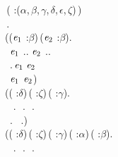 \begin{holmath}
    \,( :(\ensuremath{\alpha},\,\ensuremath{\beta},\,\ensuremath{\gamma},\,\ensuremath{\delta},\,\ensuremath{\epsilon},\,\ensuremath{\zeta})\,)\,\HOLSymConst{\HOLTokenEquiv{}}\\
\,.\,\HOLSymConst{\HOLTokenConj{}}\\
(\HOLSymConst{\HOLTokenForall{}}(\ensuremath{\HOLBoundVar{e}\sb{\mathrm{1}}} :\ensuremath{\beta})\,(\ensuremath{\HOLBoundVar{e}\sb{\mathrm{2}}} :\ensuremath{\beta}).\\
\,\,\,\ensuremath{\HOLBoundVar{e}\sb{\mathrm{1}}}\,\HOLSymConst{\HOLTokenIn{}}\,..\,\HOLSymConst{\HOLTokenConj{}}\,\ensuremath{\HOLBoundVar{e}\sb{\mathrm{2}}}\,\HOLSymConst{\HOLTokenIn{}}\,..\,\HOLSymConst{\HOLTokenImp{}}\\
\,\,\,.\,\ensuremath{\HOLBoundVar{e}\sb{\mathrm{1}}}\,\ensuremath{\HOLBoundVar{e}\sb{\mathrm{2}}}\,\HOLSymConst{\HOLTokenImp{}}\\
\,\,\,\ensuremath{\HOLBoundVar{e}\sb{\mathrm{1}}}\,\HOLSymConst{\HOLTokenNotEqual{}}\,\ensuremath{\HOLBoundVar{e}\sb{\mathrm{2}}})\,\HOLSymConst{\HOLTokenConj{}}\\
(\HOLSymConst{\HOLTokenForall{}}( :\ensuremath{\delta})\,( :\ensuremath{\zeta})\,( :\ensuremath{\gamma}).\\
\,\,\,\,\HOLSymConst{\HOLTokenIn{}}\,.\,\HOLSymConst{\HOLTokenConj{}}\,\,\HOLSymConst{\HOLTokenIn{}}\,.\,\HOLSymConst{\HOLTokenConj{}}\,\,\HOLSymConst{\HOLTokenIn{}}\,.\,\HOLSymConst{\HOLTokenImp{}}\\
\,\,\,.\,\,\,\,\HOLSymConst{\HOLTokenIn{}}\,.)\,\HOLSymConst{\HOLTokenConj{}}\\
(\HOLSymConst{\HOLTokenForall{}}( :\ensuremath{\delta})\,( :\ensuremath{\zeta})\,( :\ensuremath{\gamma})\,( :\ensuremath{\alpha})\,( :\ensuremath{\beta}).\\
\,\,\,\,\HOLSymConst{\HOLTokenIn{}}\,.\,\HOLSymConst{\HOLTokenConj{}}\,\,\HOLSymConst{\HOLTokenIn{}}\,.\,\HOLSymConst{\HOLTokenConj{}}\,\,\HOLSymConst{\HOLTokenIn{}}\,.\,\HOLSymConst{\HOLTokenConj{}}\\

\end{holmath}
